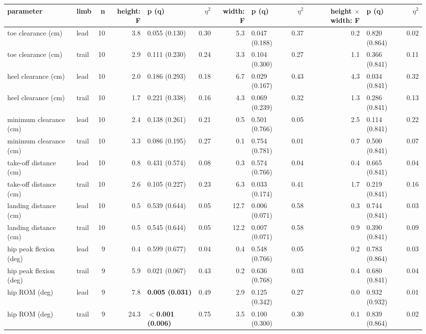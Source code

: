 \begin{adjustbox}{max width=\textwidth}
{\scriptsize
\begin{tabular}{llrrlrrlrrlr}
\toprule
\textbf{parameter} & \textbf{limb} & \textbf{n} & \textbf{height: F} & \textbf{p (q)} & \textbf{$\eta^2$} & \textbf{width: F} & \textbf{p (q)} & \textbf{$\eta^2$} & \textbf{height $\times$ width: F} & \textbf{p (q)} & \textbf{$\eta^2$} \\
\midrule
toe clearance (cm) & lead & 10 & 3.8 & 0.055 (0.130) & 0.30 & 5.3 & 0.047 (0.188) & 0.37 & 0.2 & 0.820 (0.864) & 0.02 \\
toe clearance (cm) & trail & 10 & 2.9 & 0.111 (0.230) & 0.24 & 3.3 & 0.104 (0.300) & 0.27 & 1.1 & 0.366 (0.841) & 0.11 \\
heel clearance (cm) & lead & 10 & 2.0 & 0.186 (0.293) & 0.18 & 6.7 & 0.029 (0.167) & 0.43 & 4.3 & 0.034 (0.841) & 0.32 \\
heel clearance (cm) & trail & 10 & 1.7 & 0.221 (0.338) & 0.16 & 4.3 & 0.069 (0.239) & 0.32 & 1.3 & 0.286 (0.841) & 0.13 \\
minimum clearance (cm) & lead & 10 & 2.4 & 0.138 (0.261) & 0.21 & 0.5 & 0.501 (0.766) & 0.05 & 2.5 & 0.114 (0.841) & 0.22 \\
minimum clearance (cm) & trail & 10 & 3.3 & 0.086 (0.195) & 0.27 & 0.1 & 0.754 (0.781) & 0.01 & 0.7 & 0.500 (0.841) & 0.07 \\
take-off distance (cm) & lead & 10 & 0.8 & 0.431 (0.574) & 0.08 & 0.3 & 0.574 (0.766) & 0.04 & 0.4 & 0.665 (0.841) & 0.04 \\
take-off distance (cm) & trail & 10 & 2.6 & 0.105 (0.227) & 0.23 & 6.3 & 0.033 (0.174) & 0.41 & 1.7 & 0.219 (0.841) & 0.16 \\
landing distance (cm) & lead & 10 & 0.5 & 0.539 (0.644) & 0.05 & 12.7 & 0.006 (0.071) & 0.58 & 0.3 & 0.744 (0.841) & 0.03 \\
landing distance (cm) & trail & 10 & 0.5 & 0.545 (0.644) & 0.05 & 12.2 & 0.007 (0.071) & 0.58 & 0.9 & 0.390 (0.841) & 0.09 \\
hip peak flexion (deg) & lead & 9 & 0.4 & 0.599 (0.677) & 0.04 & 0.4 & 0.548 (0.766) & 0.05 & 0.2 & 0.783 (0.864) & 0.03 \\
hip peak flexion (deg) & trail & 9 & 5.9 & 0.021 (0.067) & 0.43 & 0.2 & 0.636 (0.768) & 0.03 & 0.4 & 0.680 (0.841) & 0.04 \\
hip ROM (deg) & lead & 9 & 7.8 & \textbf{0.005 (0.031)} & 0.49 & 2.9 & 0.125 (0.342) & 0.27 & 0.0 & 0.932 (0.932) & 0.01 \\
hip ROM (deg) & trail & 9 & 24.3 & \textbf{$<$0.001 (0.006)} & 0.75 & 3.5 & 0.100 (0.300) & 0.30 & 0.1 & 0.839 (0.864) & 0.02 \\

\end{tabular}}
\end{adjustbox}
